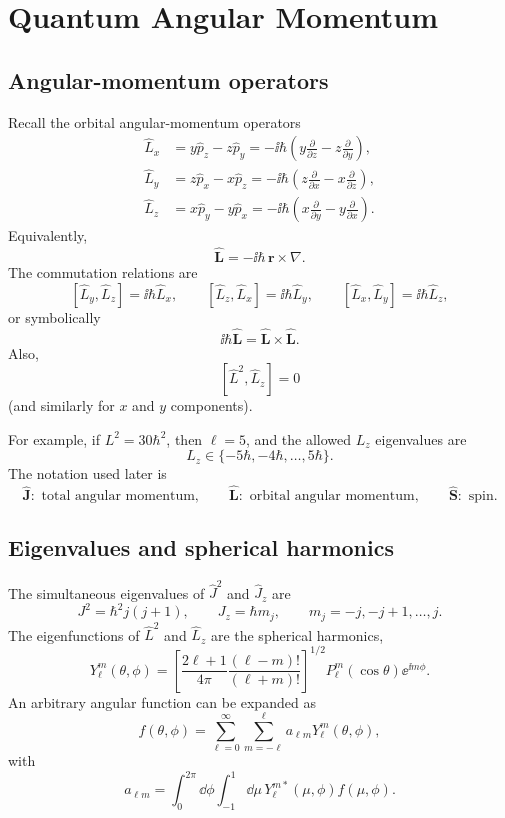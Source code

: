 \chapter{Quantum Angular Momentum}

\section{Angular-momentum operators}
Recall the orbital angular-momentum operators
\begin{align*}
  \widehat L_x
  &=y\widehat p_z-z\widehat p_y
  =-\ii\hbar\left(y\frac{\partial}{\partial z}-z\frac{\partial}{\partial y}\right),\\
  \widehat L_y
  &=z\widehat p_x-x\widehat p_z
  =-\ii\hbar\left(z\frac{\partial}{\partial x}-x\frac{\partial}{\partial z}\right),\\
  \widehat L_z
  &=x\widehat p_y-y\widehat p_x
  =-\ii\hbar\left(x\frac{\partial}{\partial y}-y\frac{\partial}{\partial x}\right).
\end{align*}
Equivalently,
\[
  \widehat{\bm L}=-\ii\hbar\,\bm r\times\nabla.
\]
The commutation relations are
\[
  [\widehat L_y,\widehat L_z]=\ii\hbar\widehat L_x,
  \qquad
  [\widehat L_z,\widehat L_x]=\ii\hbar\widehat L_y,
  \qquad
  [\widehat L_x,\widehat L_y]=\ii\hbar\widehat L_z,
\]
or symbolically
\[
  \ii\hbar\widehat{\bm L}=\widehat{\bm L}\times\widehat{\bm L}.
\]
Also,
\[
  [\widehat L^2,\widehat L_z]=0
\]
(and similarly for $x$ and $y$ components).

For example, if $L^2=30\hbar^2$, then $\ell=5$, and the allowed $L_z$ eigenvalues are
\[
  L_z\in\{-5\hbar,-4\hbar,\ldots,5\hbar\}.
\]
The notation used later is
\[
  \widehat{\bm J}:\text{ total angular momentum},
  \qquad
  \widehat{\bm L}:\text{ orbital angular momentum},
  \qquad
  \widehat{\bm S}:\text{ spin}.
\]

\section{Eigenvalues and spherical harmonics}
The simultaneous eigenvalues of $\widehat J^2$ and $\widehat J_z$ are
\[
  J^2=\hbar^2j(j+1),
  \qquad
  J_z=\hbar m_j,
  \qquad
  m_j=-j,-j+1,\ldots,j.
\]
The eigenfunctions of $\widehat L^2$ and $\widehat L_z$ are the spherical harmonics,
\begin{equation}
  Y_\ell^m(\theta,\phi)
  =\left[\frac{2\ell+1}{4\pi}
  \frac{(\ell-m)!}{(\ell+m)!}\right]^{1/2}
  P_\ell^m(\cos\theta)\ee^{\ii m\phi}.
  \label{eq:qam-spherical-harmonics}
\end{equation}
An arbitrary angular function can be expanded as
\[
  f(\theta,\phi)
  =\sum_{\ell=0}^{\infty}\sum_{m=-\ell}^{\ell}
  a_{\ell m}Y_\ell^m(\theta,\phi),
\]
with
\[
  a_{\ell m}
  =\int_0^{2\pi}\dd\phi\int_{-1}^{1}\dd\mu\,
  Y_\ell^{m*}(\mu,\phi)f(\mu,\phi).
\]

